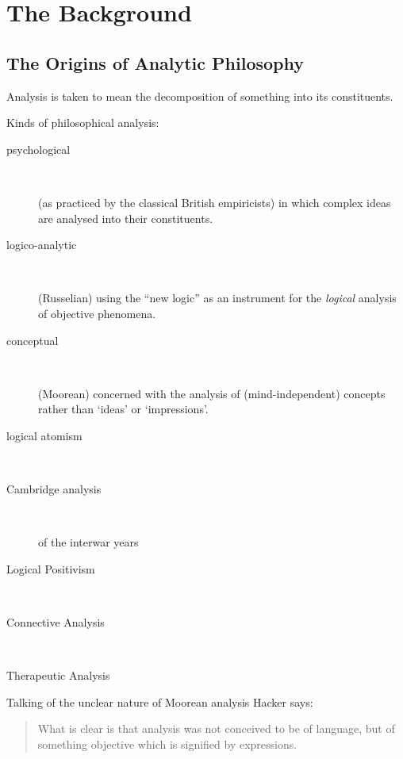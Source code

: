 \chapter{The Background}
\section{The Origins of Analytic Philosophy}

Analysis is taken to mean the decomposition of something into its constituents.


Kinds of philosophical analysis:

\begin{description}
\item[psychological]\ 

(as practiced by the classical British empiricists)
in which complex ideas are analysed into their constituents.
\item[logico-analytic]\ 

(Russelian) using the ``new logic'' as an instrument for the {\it logical} analysis of objective phenomena.
\item[conceptual]\ 

(Moorean) concerned with the analysis of (mind-independent) concepts rather than `ideas' or `impressions'.
\item[logical atomism]\ 

\item[Cambridge analysis]\ 

of the interwar years

\item[Logical Positivism]\

\item[Connective Analysis]\

\item[Therapeutic Analysis]

\end{description}

Talking of the unclear nature of Moorean analysis Hacker says:
\begin{quotation}
What is clear is that analysis was not conceived to be of language, but of something objective which is signified by expressions.
\end{quotation}

